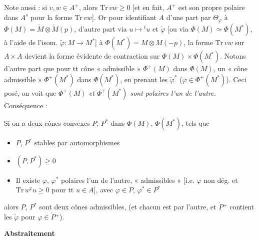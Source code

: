 \documentclass[11pt,a4paper]{article}
\begin{document}
Note aussi :  si $v, w \in A^{+}$,
\struck{\ill{}} alors $\mathrm{Tr}\, vw \geqslant 0$ [et en fait, $A^{+}$
est son propre polaire dans $A^{s}$ pour la forme $\mathrm{Tr}\, vw$].
Or pour
identifiant $A$ d'une part par $\Theta_{\varphi}$ à
$\Phi(M) = \check M \otimes \check M(p)$, d'autre part via
\struck{\ill{}} $u \mapsto {}^{t}u$ et $\check\varphi$ [ou via
$\Phi(M) \simeq \Phi(M^{*})$, à l'aide de l'isom.
$\tilde\varphi \colon M \to M^{*}$] à $\Phi(M^{*}) = M \otimes M(-p)$, la
forme $\mathrm{Tr}\, vw$ sur $A \times A$ devient la forme évidente de
contraction sur $\Phi(M) \times \Phi(M^{*})$. Notons d'autre part que pour
tt cône  \struck{\ill{}} « admissible » $\Phi^{+}(M)$ dans
$\Phi(M)$,  un « cône admissible » $\Phi^{+}(M^{*})$
dans $\Phi(M^{*})$, en prenant les $\check\varphi^{*}$
($\varphi \in \Phi^{+}(M^{*})$).
Ceci posé, on voit que \emph{$\Phi^{+}(M)$ et $\Phi^{+}(M^{*})$ sont
polaires l'un de l'autre.} Conséquence :

Si on a deux cônes convexes  $P$, $P^{*}$ dans $\Phi(M)$,
$\Phi(M^{*})$,  tels que
\begin{itemize}
  \item[a)] $P$, $P^{*}$ stables par automorphismes
  \item[b)] $(P, P^{*}) \geqslant 0$
  \item[c)] Il existe $\varphi$, $\varphi^{*}$ polaires l'un de l'autre,
    « admissibles » [i.e.  $\varphi$ non dég. et
    $\mathrm{Tr}\, u^{\varphi} u \geqslant 0$ pour tt $u \in A$], avec
    $\varphi \in P$, $\varphi^{*} \in P^{*}$
\end{itemize}
alors $P$, $P^{*}$ sont  deux cônes
admissibles, (et  chacun est 
par l'autre, et $\mathring{P}{}^{+}$ contient les $\check\varphi$ pour
$\varphi \in \mathring{P}{}^{+}$).

\textbf{Abstraitement}
\end{document}

